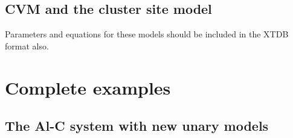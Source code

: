 \documentclass{article}
\begin{document}
\begin{appendices}
\subsection{CVM and the cluster site model}

Parameters and equations for these models should be included in the
XTDB format also.

\newpage

\setcounter{equation}{0}
\renewcommand{\theequation}{D\arabic{equation}}
\setcounter{figure}{0}
\renewcommand{\thefigure}{D\arabic{figure}}


\section{Complete examples}\label{sec:complete}

\subsection{The Al-C system with new unary models}\label{sec:alc}


\end{appendices}
\end{document}

